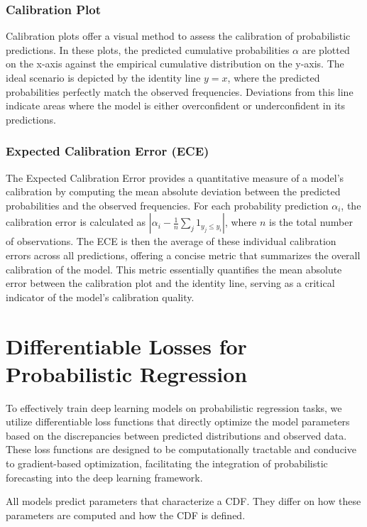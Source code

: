 \documentclass{article}
\begin{document}
\subsubsection{Calibration Plot}
Calibration plots offer a visual method to assess the calibration of probabilistic predictions. In these plots, the predicted cumulative probabilities $\alpha$ are plotted on the x-axis against the empirical cumulative distribution on the y-axis. The ideal scenario is depicted by the identity line $y = x$, where the predicted probabilities perfectly match the observed frequencies. Deviations from this line indicate areas where the model is either overconfident or underconfident in its predictions.

\subsubsection{Expected Calibration Error (ECE)}
The Expected Calibration Error provides a quantitative measure of a model's calibration by computing the mean absolute deviation between the predicted probabilities and the observed frequencies. For each probability prediction $\alpha_i$, the calibration error is calculated as $|\alpha_i - \frac{1}{n}\sum_{j} \mathrm{1}_{y_j \leq y_i}|$, where $n$ is the total number of observations. The ECE is then the average of these individual calibration errors across all predictions, offering a concise metric that summarizes the overall calibration of the model. This metric essentially quantifies the mean absolute error between the calibration plot and the identity line, serving as a critical indicator of the model's calibration quality.


\section{Differentiable Losses for Probabilistic Regression}
To effectively train deep learning models on probabilistic regression tasks, we utilize differentiable loss functions that directly optimize the model parameters based on the discrepancies between predicted distributions and observed data. These loss functions are designed to be computationally tractable and conducive to gradient-based optimization, facilitating the integration of probabilistic forecasting into the deep learning framework.

All models predict parameters that characterize a CDF. They differ on how these parameters are computed and how the CDF is defined. 
\end{document}
